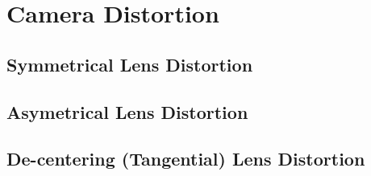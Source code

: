 \section{Camera Distortion}

\subsection{Symmetrical Lens Distortion}
\subsection{Asymetrical Lens Distortion}
\subsection{De-centering (Tangential) Lens Distortion}

